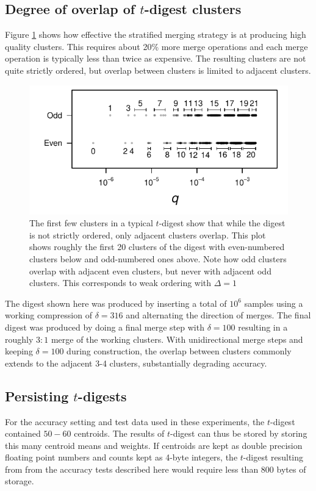 \documentclass[]{statsoc}
\begin{document}
\subsection{Degree of overlap of $t$-digest clusters}
Figure \ref{fig:cluster-spread} shows how effective the stratified merging strategy  is at producing high quality clusters. This requires about 20\% more merge operations and  each merge operation is typically less than twice as expensive. The resulting clusters are not quite strictly ordered, but overlap between clusters is limited to adjacent clusters.
\begin{figure}[htb] %
   \includegraphics[width=4.5in]{cluster-spread.pdf} 
   \caption{The first few clusters in a typical $t$-digest show that while the digest is not strictly ordered, only adjacent clusters overlap. This plot shows roughly the first 20 clusters of the digest with even-numbered clusters below and odd-numbered ones above. Note how odd clusters overlap with adjacent even clusters, but never with adjacent odd clusters. This corresponds to weak ordering with $\Delta=1$  }
   \label{fig:cluster-spread}
\end{figure}
The digest shown here was produced by inserting 
a total of $10^6$ samples using a working compression of $\delta = 316$ and alternating the direction of merges. The final digest was produced by doing a final merge step with $\delta = 100$ resulting in a roughly $3:1$ merge of the working clusters. With unidirectional merge steps and keeping $\delta=100$ during construction, the overlap between clusters commonly extends to the adjacent 3-4 clusters, substantially degrading accuracy.

\subsection{Persisting $t$-digests}
For the accuracy setting and test data used in these experiments, the $t$-digest contained $50-60$ centroids.  The results of $t$-digest can thus be stored by storing this many centroid means and weights.  If centroids are kept as double precision floating point numbers and counts kept as 4-byte integers, the $t$-digest resulting from from the accuracy tests described here would require less than 800 bytes of storage.
\end{document}
